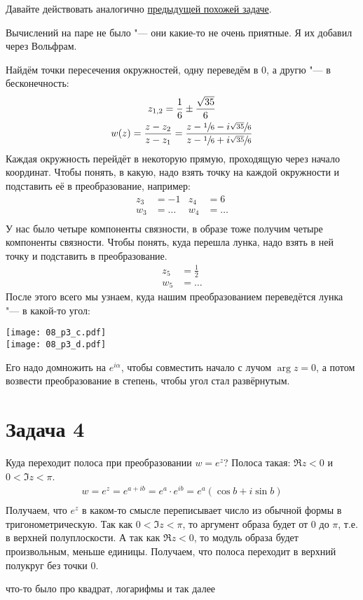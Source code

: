 	Давайте действовать аналогично \hyperref[day150331_task5]{предыдущей похожей задаче}.
	\begin{Rem}
		Вычислений на паре не было "--- они какие-то не очень приятные.
		Я их добавил через Вольфрам.
	\end{Rem}
	Найдём точки пересечения окружностей, одну переведём в 0, а другю "--- в бесконечность:
	\begin{gather*}
		z_{1,2} = \frac 16 \pm \frac{\sqrt{35}}{6} \\
		w(z) = \frac{z-z_2}{z-z_1} = \frac{z - \sfrac 16 - i\sfrac{\sqrt{35}}6}{z-\sfrac 16 + i\sfrac{\sqrt{35}}6}
	\end{gather*}
	Каждая окружность перейдёт в некоторую прямую, проходящую через начало координат.
	Чтобы понять, в какую, надо взять точку на каждой окружности и подставить её в преобразование,
	например:
	\begin{align*}
		z_3 &= -1 & z_4 &= 6 \\
		w_3 &= \dots & w_4 &= \dots \\
	\end{align*}
	У нас было четыре компоненты связности, в образе тоже получим четыре компоненты связности.
	Чтобы понять, куда перешла лунка, надо взять в ней точку и подставить в преобразование.
	\begin{align*}
		z_5 &= \frac 1 2 \\
		w_5 &= \dots
	\end{align*}
	После этого всего мы узнаем, куда нашим преобразованием переведётся лунка "--- в какой-то угол:

	\begin{center}
		\texttt{[image: 08\_p3\_c.pdf]} \\
		\texttt{[image: 08\_p3\_d.pdf]}
	\end{center}

	Его надо домножить на $e^{i\alpha}$, чтобы совместить начало с лучом $\arg z = 0$,
	а потом возвести преобразование в степень, чтобы угол стал развёрнутым.

\section{Задача 4}
	\TODO
	Куда переходит полоса при преобразовании $w=e^z$?
	Полоса такая: $\Re z < 0$ и $0 < \Im z < \pi$.
	\begin{gather*}
		w=e^z=e^{a+ib}=e^a\cdot e^{ib} = e^a (\cos b + i\sin b)\\
	\end{gather*}
	Получаем, что $e^z$ в каком-то смысле переписывает число из обычной формы в тригонометрическую.
	Так как $0 < \Im z < \pi$, то аргумент образа будет от $0$ до $\pi$, т.е. в верхней полуплоскости.
	А так как $\Re z < 0$, то модуль образа будет произвольным, меньше единицы.
	Получаем, что полоса переходит в верхний полукруг без точки 0.

\TODO что-то было про квадрат, логарифмы и так далее
